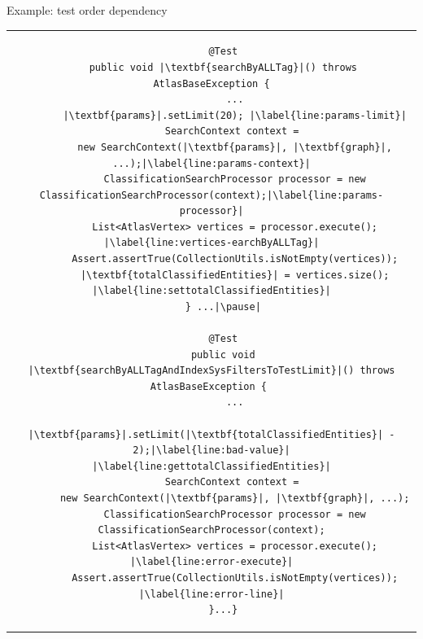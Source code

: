 \documentclass{beamer}
\begin{document}
{\begin{frame}[fragile]{Example: test order dependency}
\begin{center}
\begin{table}[h]
\begin{tabular}{c}
\begin{lstlisting}
	@Test
	public void |\textbf{searchByALLTag}|() throws AtlasBaseException {
		...
		|\textbf{params}|.setLimit(20); |\label{line:params-limit}|
		SearchContext context = 
		new SearchContext(|\textbf{params}|, |\textbf{graph}|, ...);|\label{line:params-context}|
		ClassificationSearchProcessor processor = new ClassificationSearchProcessor(context);|\label{line:params-processor}|
		List<AtlasVertex> vertices = processor.execute(); |\label{line:vertices-earchByALLTag}|
		Assert.assertTrue(CollectionUtils.isNotEmpty(vertices));
		|\textbf{totalClassifiedEntities}| = vertices.size(); |\label{line:settotalClassifiedEntities}|
	} ...|\pause|
	
	@Test
	public void |\textbf{searchByALLTagAndIndexSysFiltersToTestLimit}|() throws AtlasBaseException { 
		...
		|\textbf{params}|.setLimit(|\textbf{totalClassifiedEntities}| - 2);|\label{line:bad-value}| |\label{line:gettotalClassifiedEntities}|
		SearchContext context = 
		new SearchContext(|\textbf{params}|, |\textbf{graph}|, ...);
		ClassificationSearchProcessor processor = new ClassificationSearchProcessor(context);
		List<AtlasVertex> vertices = processor.execute(); |\label{line:error-execute}|
		Assert.assertTrue(CollectionUtils.isNotEmpty(vertices)); |\label{line:error-line}|
	}...}
\end{lstlisting}
		\end{tabular}
		\vspace{-7ex}
	\end{table}
\end{center}
\end{frame}

}
\end{document}
